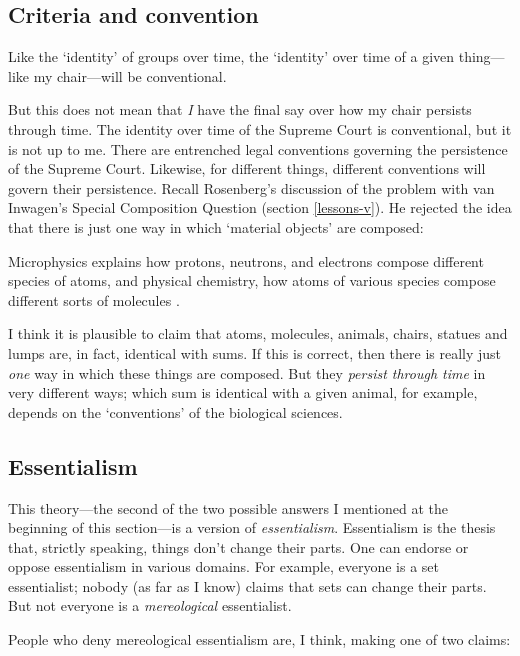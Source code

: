 \documentclass[11pt]{article}
\newenvironment{squote}{%
\begin{spacing}{1}
\begin{list}{}{%
\setlength{\labelwidth}{0pt}%
\rightmargin\leftmargin%
}
\item\relax
}{%
\end{list}%
\end{spacing}
}
\begin{document}
\begin{spacing}{1.5}
\subsection{Criteria and convention}
\label{criteria}
Like the `identity' of groups over time, the `identity' over time of a
given thing---like my chair---will be conventional.

But this does not mean that {\em I} have the final say over how my
chair persists through time.  The identity over time of the Supreme
Court is conventional, but it is not up to me.  There are entrenched
legal conventions governing the persistence of the Supreme Court.
Likewise, for different things, different conventions will govern
their persistence.  Recall Rosenberg's discussion of the problem with
van Inwagen's Special Composition Question (section \ref{lessons-v}).
He rejected the idea that there is just one way in which `material
objects' are composed:

\begin{squote}
Microphysics explains how protons, neutrons, and electrons compose
different species of atoms, and physical chemistry, how atoms of
various species compose different sorts of molecules
\citep[706]{rosenberg1993}.
\end{squote}

I think it is plausible to claim that atoms, molecules, animals,
chairs, statues and lumps are, in fact, identical with sums.  If this
is correct, then there is really just {\em one} way in which these
things are composed.  But they {\em persist through time} in very
different ways; which sum is identical with a given animal, for
example, depends on the `conventions' of the biological sciences.

\subsection{Essentialism}
\label{essentialism}
This theory---the second of the two possible answers I mentioned at
the beginning of this section---is a version of {\em essentialism}.
Essentialism is the thesis that, strictly speaking, things don't
change their parts.  One can endorse or oppose essentialism in various
domains.  For example, everyone is a set essentialist; nobody (as far
as I know) claims that sets can change their parts.  But not everyone
is a {\em mereological} essentialist.

People who deny mereological essentialism are, I think, making one of
two claims:


\end{spacing}
\end{document}

